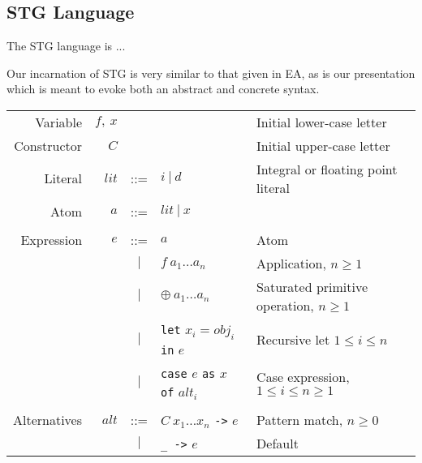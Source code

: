 \documentclass{llncs}
\begin{document}
\subsection{STG Language}
\setlength{\tabcolsep}{5pt}

The STG language is ...

Our incarnation of STG is very similar to that given in EA, as is
our presentation which is meant to evoke both an abstract and concrete syntax.

\begin{table}
\footnotesize %
\centering
\begin{tabular}{r r c l l}

Variable     & $f,\ x$        &     &                                              & Initial lower-case letter \\
Constructor  & $C$            &     &                                              & Initial upper-case letter \\
Literal      & $\mathit{lit}$ & ::= & $i\ |\ d$                                    & Integral or floating point literal \\
Atom         & $a$            & ::= & $\mathit{lit}\ |\ x$                         & \\ %
\\
Expression   & $e$            & ::= & $a$                                          & Atom \\
             &                & $|$ & $f\ a_1\dots a_n$                            & Application, $n\ge 1$ \\
             &                & $|$ & $\oplus\ a_1\dots a_n$                       & Saturated primitive operation, $n\ge 1$ \\
             &                & $|$ & \texttt{let} $x_i = \mathit{obj}_i$
                                         \texttt{in} $e$                           & Recursive let $1\le i \le n$\\
             &                & $|$ & \texttt{case} $e$ \texttt{as}
                                        $x$ \texttt{of} $\mathit{alt}_i$           & Case expression, $1\le i \le n \ge 1$\\
\\
Alternatives & $\mathit{alt}$ & ::= & $C\ x_1\dots x_n$ \texttt{->} $e$            & Pattern match, $n \ge 0$ \\
             &                & $|$ & \texttt{\_ ->} $e$                           & Default \\

\end{tabular}
\end{table}
\end{document}
